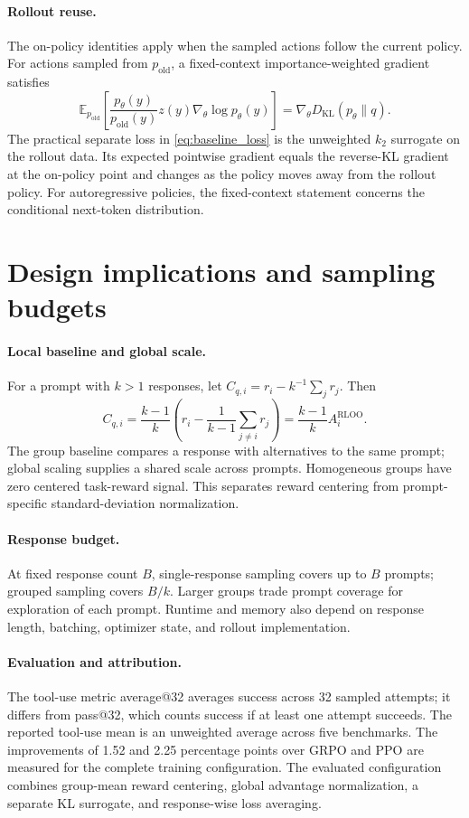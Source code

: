 \paragraph{Rollout reuse.}
The on-policy identities apply when the sampled actions follow the current policy. For actions sampled from $p_{\mathrm{old}}$, a fixed-context importance-weighted gradient satisfies
\begin{equation}
 \mathbb{E}_{p_{\mathrm{old}}}\left[
 \frac{p_\theta(y)}{p_{\mathrm{old}}(y)}z(y)\nabla_\theta\log p_\theta(y)
 \right]=\nabla_\theta D_{\mathrm{KL}}(p_\theta\|q).
\end{equation}
The practical separate loss in \cref{eq:baseline_loss} is the unweighted $k_2$ surrogate on the rollout data. Its expected pointwise gradient equals the reverse-KL gradient at the on-policy point and changes as the policy moves away from the rollout policy. For autoregressive policies, the fixed-context statement concerns the conditional next-token distribution.


\section{Design implications and sampling budgets}\label{appendix:design}
\paragraph{Local baseline and global scale.}
For a prompt with $k>1$ responses, let $C_{q,i}=r_i-k^{-1}\sum_j r_j$. Then
\begin{equation}\label{eq:rloo_relation}
 C_{q,i}=\frac{k-1}{k}\left(r_i-\frac{1}{k-1}\sum_{j\ne i}r_j\right)
 =\frac{k-1}{k}A_i^{\mathrm{RLOO}}.
\end{equation}
The group baseline compares a response with alternatives to the same prompt; global scaling supplies a shared scale across prompts. Homogeneous groups have zero centered task-reward signal. This separates reward centering from prompt-specific standard-deviation normalization.
\paragraph{Response budget.}
At fixed response count $B$, single-response sampling covers up to $B$ prompts; grouped sampling covers $B/k$. Larger groups trade prompt coverage for exploration of each prompt. Runtime and memory also depend on response length, batching, optimizer state, and rollout implementation.
\paragraph{Evaluation and attribution.}
The tool-use metric average@32 averages success across 32 sampled attempts; it differs from pass@32, which counts success if at least one attempt succeeds. The reported tool-use mean is an unweighted average across five benchmarks. The improvements of 1.52 and 2.25 percentage points over GRPO and PPO are measured for the complete training configuration. The evaluated configuration combines group-mean reward centering, global advantage normalization, a separate KL surrogate, and response-wise loss averaging.
